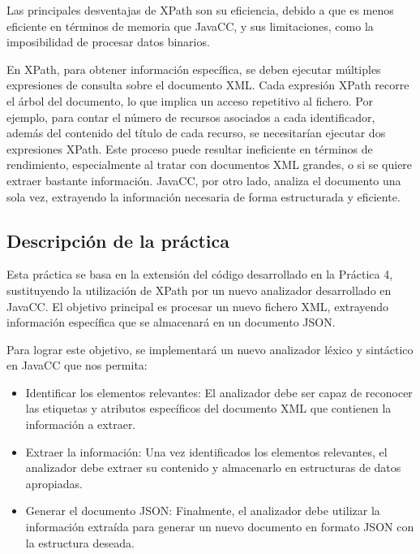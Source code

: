 Las principales desventajas de XPath son su eficiencia, debido a que es menos eficiente en términos de memoria que JavaCC, y sus limitaciones, como la imposibilidad de procesar datos binarios.


En XPath, para obtener información específica, se deben ejecutar múltiples expresiones de consulta sobre el documento XML. Cada expresión XPath recorre el árbol del documento, lo que implica un acceso repetitivo al fichero. Por ejemplo, para contar el número de recursos asociados a cada identificador, además del contenido del título de cada recurso, se necesitarían ejecutar dos expresiones XPath. Este proceso puede resultar ineficiente en términos de rendimiento, especialmente al tratar con documentos XML grandes, o si se quiere extraer bastante información. JavaCC, por otro lado, analiza el documento una sola vez, extrayendo la información necesaria de forma estructurada y eficiente.

\subsection{Descripción de la práctica}

\noindent Esta práctica se basa en la extensión del código desarrollado en la Práctica 4, sustituyendo la utilización de XPath por un nuevo analizador desarrollado en JavaCC. El objetivo principal es procesar un nuevo fichero XML, extrayendo información específica que se almacenará en un documento JSON.

Para lograr este objetivo, se implementará un nuevo analizador léxico y sintáctico en JavaCC que nos permita:

\begin{itemize}
  \item Identificar los elementos relevantes: El analizador debe ser capaz de reconocer las etiquetas y atributos específicos del documento XML que contienen la información a extraer.
  \item Extraer la información: Una vez identificados los elementos relevantes, el analizador debe extraer su contenido y almacenarlo en estructuras de datos apropiadas.
  \item Generar el documento JSON: Finalmente, el analizador debe utilizar la información extraída para generar un nuevo documento en formato JSON con la estructura deseada.
\end{itemize}


